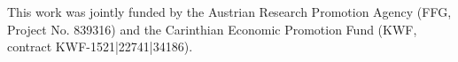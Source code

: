This work was jointly funded by the Austrian Research Promotion Agency (FFG, Project No. 839316) and the Carinthian Economic Promotion Fund (KWF, contract KWF-1521|22741|34186).
